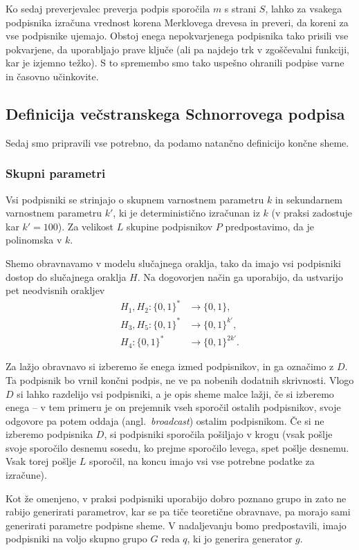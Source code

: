 Ko sedaj preverjevalec preverja podpis sporočila $m$ s strani $S$, lahko za vsakega podpisnika
izračuna vrednost korena Merklovega drevesa in preveri, da koreni za vse podpisnike ujemajo. Obstoj
enega nepokvarjenega podpisnika tako prisili vse pokvarjene, da uporabljajo prave ključe (ali pa
najdejo trk v zgoščevalni funkciji, kar je izjemno težko). S to spremembo smo tako uspešno ohranili
podpise varne in časovno učinkovite.

\subsection{Definicija večstranskega Schnorrovega podpisa}
\label{sec:def_multi_schnorr}
Sedaj smo pripravili vse potrebno, da podamo natančno definicijo končne sheme.

\subsubsection{Skupni parametri}
Vsi podpisniki se strinjajo o skupnem varnostnem parametru $k$ in sekundarnem varnostnem parametru
$k'$, ki je deterministično izračunan iz $k$ (v praksi zadostuje kar $k' = 100$). Za velikost $L$
skupine podpisnikov $P$ predpostavimo, da je polinomska v $k$.

Shemo obravnavamo v modelu slučajnega oraklja, tako da imajo vsi podpisniki dostop do slučajnega
oraklja $H$. Na dogovorjen način ga uporabijo, da ustvarijo pet neodvisnih orakljev
\begin{align*}
    H_1, H_2: \{0, 1\}^* &\rightarrow \{0, 1\}, \\
    H_3, H_5: \{0, 1\}^* &\rightarrow \{0, 1\}^{k'}, \\
    H_4: \{0, 1\}^* &\rightarrow \{0, 1\}^{2k'}.
\end{align*}

Za lažjo obravnavo si izberemo še enega izmed podpisnikov, in ga označimo z $D$. Ta podpisnik bo
vrnil končni podpis, ne ve pa nobenih dodatnih skrivnosti. Vlogo $D$ si lahko razdelijo vsi podpisniki,
a je opis sheme malce lažji, če si izberemo enega -- v tem primeru je on prejemnik vseh sporočil
ostalih podpisnikov, svoje odgovore pa potem oddaja (angl.\ \textit{broadcast}) ostalim podpisnikom.
Če si ne izberemo podpisnika $D$, si podpisniki sporočila pošiljajo v krogu (vsak pošlje svoje sporočilo
desnemu sosedu, ko prejme sporočilo levega, spet pošlje desnemu. Vsak torej pošlje $L$ sporočil, na
koncu imajo vsi vse potrebne podatke za izračune).

Kot že omenjeno, v praksi podpisniki uporabijo dobro poznano grupo in zato ne rabijo generirati
parametrov, kar se pa tiče teoretične obravnave, pa morajo sami generirati parametre podpisne sheme.
V nadaljevanju bomo predpostavili, imajo podpisniki na voljo skupno grupo $G$ reda $q$, ki jo generira
generator $g$.

